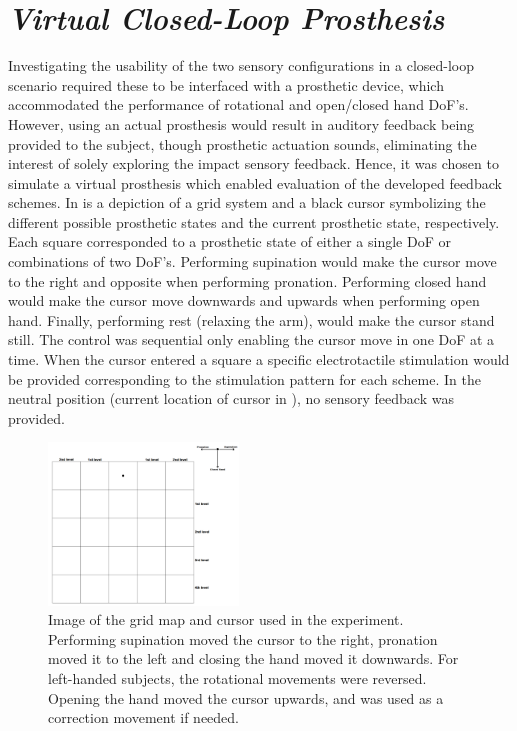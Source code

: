 

\section{\textit{Virtual Closed-Loop Prosthesis}}

Investigating the usability of the two sensory configurations in a closed-loop scenario required these to be interfaced with a prosthetic device, which accommodated the performance of rotational and open/closed hand DoF's. However, using an actual prosthesis would result in auditory feedback being provided to the subject, though prosthetic actuation sounds, eliminating the interest of solely exploring the impact sensory feedback. Hence, it was chosen to simulate a virtual prosthesis which enabled evaluation of the developed feedback schemes. In  is a depiction of a grid system and a black cursor symbolizing the different possible prosthetic states and the current prosthetic state, respectively. Each square corresponded to a prosthetic state of either a single DoF or combinations of two DoF's. Performing supination would make the cursor move to the right and opposite when performing pronation. Performing closed hand would make the cursor move downwards and upwards when performing open hand. Finally, performing rest (relaxing the arm), would make the cursor stand still. The control was sequential only enabling the cursor move in one DoF at a time. When the cursor entered a square a specific electrotactile stimulation would be provided corresponding to the stimulation pattern for each scheme. In the neutral position (current location of cursor in ), no sensory feedback was provided.     

\begin{figure}[H]                 
	\includegraphics[width=0.45\textwidth]{figures/gridmap2}  
	\caption{Image of the grid map and cursor used in the experiment. Performing supination moved the cursor to the right, pronation moved it to the left and closing the hand moved it downwards. For left-handed subjects, the rotational movements were reversed. Opening the hand moved the cursor upwards, and was used as a correction movement if needed.}
	\label{fig:meth:gridmap} 
\end{figure}